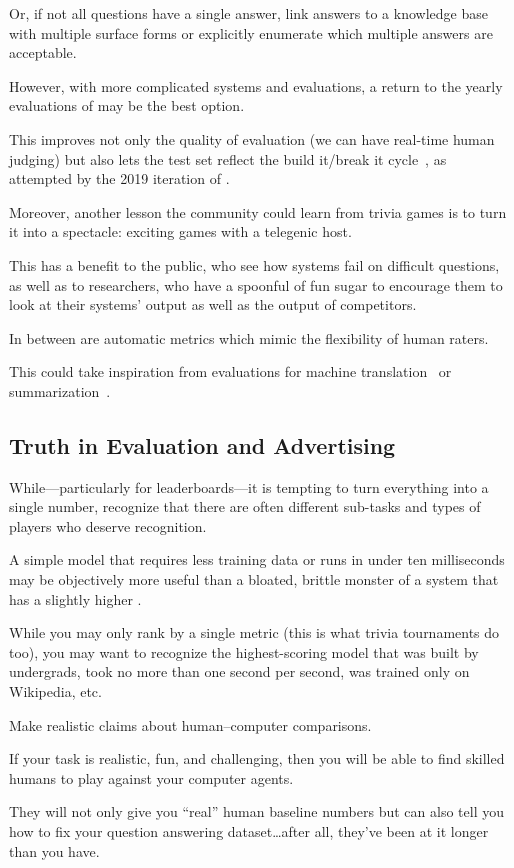 Or, if not all questions have a single answer, link answers to a knowledge base with multiple surface forms or explicitly enumerate which multiple answers are acceptable.

However, with more complicated systems and evaluations, a return to the yearly evaluations of  may be the best option.

This improves not only the quality of evaluation (we can have real-time human judging) but also lets the test set reflect the build it/break it cycle~\cite{ruef-16}, as attempted by the 2019 iteration of .

Moreover, another lesson the  community could learn from trivia games is to turn it into a spectacle: exciting games with a telegenic host.

This has a benefit to the public, who see how  systems fail on difficult questions, as well as to  researchers, who have a spoonful of fun sugar to encourage them to look at their systems' output as well as the output of competitors.

In between are automatic metrics which mimic the flexibility of human raters.

This could take inspiration from evaluations for machine translation~\cite{papineni-02,specia-10} or summarization~\cite{lin-04}.

\subsection{Truth in Evaluation and Advertising}

While---particularly for leaderboards---it is tempting to turn everything into a single number, recognize that there are often different sub-tasks and types of players who deserve recognition.

A simple model that requires less training data or runs in under ten milliseconds may be objectively more useful than a bloated, brittle monster of a system that has a slightly higher \fone{}.

While you may only rank by a single metric (this is what trivia tournaments do too), you may want to recognize the highest-scoring model that was built by undergrads, took no more than one second per second, was trained only on Wikipedia, etc.

Make realistic claims about human--computer comparisons.

If your task is realistic, fun, and challenging, then you will be able to find skilled humans to play against your computer agents.

They will not only give you ``real'' human baseline numbers but can also tell you how to fix your question answering dataset\dots after all, they've been at it longer than you have.

